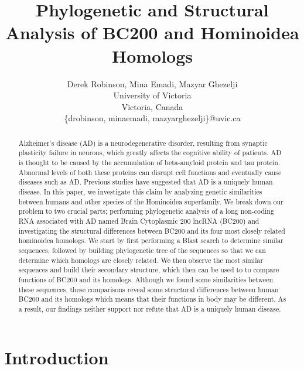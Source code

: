 \documentclass[conference, 11pt]{IEEEtran}
\begin{document}


\title{Phylogenetic and Structural Analysis of BC200 and Hominoidea Homologs}

\author{Derek Robinson, Mina Emadi, Mazyar Ghezelji\\
University of Victoria\\
Victoria, Canada \\
\{drobinson, minaemadi, mazyarghezelji\}@uvic.ca}

\maketitle

\begin{abstract}
Alzheimer’s disease (AD) is a neurodegenerative disorder, resulting from synaptic plasticity failure in neurons, which greatly affects the cognitive ability of patients. 
AD is thought to be caused by the accumulation of beta-amyloid protein and tau protein. Abnormal levels of both these proteins can disrupt cell functions and eventually cause diseases such as AD. 
Previous studies have suggested that AD is a uniquely human disease. 
In this paper, we investigate this claim by analyzing genetic similarities between humans and other species of the Hominoidea superfamily.
We break down our problem to two crucial parts; performing phylogenetic analysis of a long non-coding RNA associated with AD named Brain Cytoplasmic 200 lncRNA (BC200) and investigating the structural differences between BC200 and its four most closely related hominoidea homologs. 
We start by first performing a Blast search to determine similar sequences, followed by building phylogenetic tree of the sequences so that we can determine which homologs are closely related.
We then observe the most similar sequences and build their secondary structure, which then can be used to to compare functions of BC200 and its homologs.
Although we found some similarities between these sequences, these comparisons reveal some structural differences between human BC200 and its homologs which means that their functions in body may be different.
As a result, our findings neither support nor refute that AD is a uniquely human disease.

\end{abstract}

\section{Introduction}\label{sec:intro}
\end{document}
